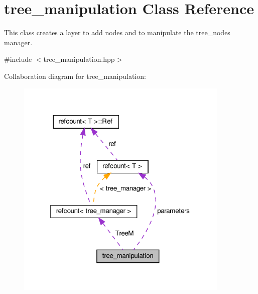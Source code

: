 \hypertarget{classtree__manipulation}{}\section{tree\+\_\+manipulation Class Reference}
\label{classtree__manipulation}


This class creates a layer to add nodes and to manipulate the tree\+\_\+nodes manager.  




{\ttfamily \#include $<$tree\+\_\+manipulation.\+hpp$>$}



Collaboration diagram for tree\+\_\+manipulation\+:
\nopagebreak
\begin{figure}[H]
\begin{center}
\leavevmode
\includegraphics[width=289pt]{d4/d96/classtree__manipulation__coll__graph}
\end{center}
\end{figure}
